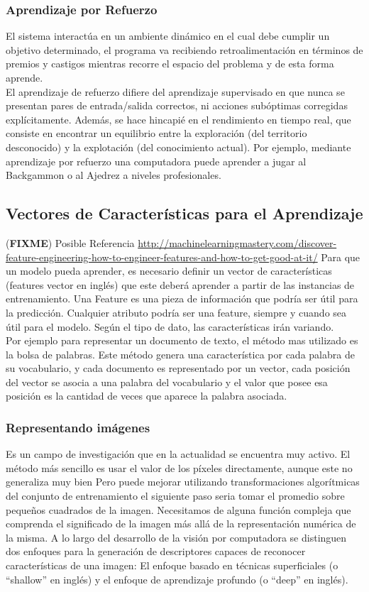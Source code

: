\documentclass[a4paper,11pt,spanish]{book}
\newcommand*{\FIXME}[1]{{(\textbf{FIXME}) {#1}}}
\begin{document}
      \subsubsection{Aprendizaje por Refuerzo}
	El sistema interactúa en un ambiente dinámico en el cual debe cumplir un objetivo determinado, el programa va recibiendo retroalimentación en términos de premios y castigos mientras
	recorre el espacio del problema y de esta forma aprende.\\
	El aprendizaje de refuerzo difiere del aprendizaje supervisado en que nunca se presentan pares de entrada/salida correctos, ni acciones subóptimas corregidas explícitamente.
	Además, se hace hincapié en el rendimiento en tiempo real, que consiste en encontrar un equilibrio entre la exploración (del territorio desconocido) y la explotación
	(del conocimiento actual).
	Por ejemplo, mediante aprendizaje por refuerzo una computadora puede aprender a jugar al Backgammon o al Ajedrez a niveles profesionales.

    \subsection{Vectores de Características para el Aprendizaje}
      \FIXME{Posible Referencia \url{http://machinelearningmastery.com/discover-feature-engineering-how-to-engineer-features-and-how-to-get-good-at-it/}}
      Para que un modelo pueda aprender, es necesario definir un vector de características (features vector en inglés) que este deberá aprender a partir de las instancias de entrenamiento.
      Una Feature es una pieza de información que podría ser útil para la predicción. Cualquier atributo podría ser una feature, siempre y cuando sea útil para el modelo.
      Según el tipo de dato, las características irán variando. \\
      Por ejemplo para representar un documento de texto, el método mas utilizado es la bolsa de palabras.
      Este método genera una característica por cada palabra de su vocabulario, y cada documento es representado por un vector, cada posición del vector se asocia a una palabra del
      vocabulario y el valor que posee esa posición es la cantidad de veces que aparece la palabra asociada.

      \subsubsection{Representando imágenes}
	Es un campo de investigación que en la actualidad se encuentra muy activo. El método más sencillo es usar el valor de los píxeles directamente, aunque este no generaliza muy bien
	Pero puede mejorar utilizando transformaciones algorítmicas del conjunto de entrenamiento el siguiente paso seria tomar el promedio sobre pequeños cuadrados de la imagen.
	Necesitamos de alguna función compleja que comprenda el significado de la imagen más allá de la representación numérica de la misma.
	A lo largo del desarrollo de la visión por computadora se distinguen dos enfoques para la generación de descriptores capaces de reconocer características de una imagen:
	El enfoque basado en técnicas superficiales (o “shallow” en inglés) y el enfoque de aprendizaje profundo (o “deep” en inglés).
\end{document}
